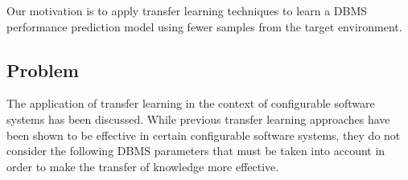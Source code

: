 Our motivation is to apply transfer learning techniques to learn a DBMS performance prediction model using fewer samples from the target environment.

\subsection{Problem}
The application of transfer learning in the context of configurable software systems has been discussed\cite{l2s,Valov,jamshidi,datareuse}. 
While previous transfer learning approaches have been shown to be effective in certain configurable software systems, they do not consider the following DBMS parameters that must be taken into account in order to make the transfer of knowledge more effective.

